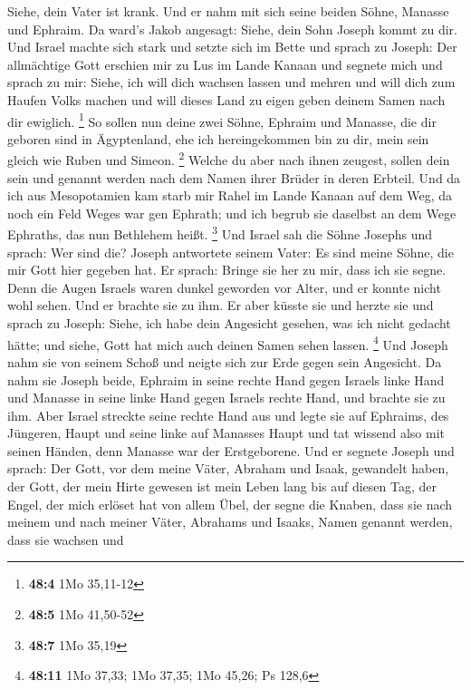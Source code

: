 Siehe, dein Vater ist krank. Und er nahm mit sich seine beiden Söhne,
Manasse und Ephraim.  Da ward's Jakob angesagt: Siehe, dein
Sohn Joseph kommt zu dir. Und Israel machte sich stark und setzte sich
im Bette  und sprach zu Joseph: Der allmächtige Gott
erschien mir zu Lus im Lande Kanaan und segnete mich  und
sprach zu mir: Siehe, ich will dich wachsen lassen und mehren und will
dich zum Haufen Volks machen und will dieses Land zu eigen geben deinem
Samen nach dir ewiglich. \footnote{\textbf{48:4} 1Mo 35,11-12}
 So sollen nun deine zwei Söhne, Ephraim und Manasse, die
dir geboren sind in Ägyptenland, ehe ich hereingekommen bin zu dir, mein
sein gleich wie Ruben und Simeon. \footnote{\textbf{48:5} 1Mo 41,50-52}
 Welche du aber nach ihnen zeugest, sollen dein sein und
genannt werden nach dem Namen ihrer Brüder in deren Erbteil.
 Und da ich aus Mesopotamien kam starb mir Rahel im Lande
Kanaan auf dem Weg, da noch ein Feld Weges war gen Ephrath; und ich
begrub sie daselbst an dem Wege Ephraths, das nun Bethlehem heißt.
\footnote{\textbf{48:7} 1Mo 35,19}  Und Israel sah die Söhne
Josephs und sprach: Wer sind die?  Joseph antwortete seinem
Vater: Es sind meine Söhne, die mir Gott hier gegeben hat. Er sprach:
Bringe sie her zu mir, dass ich sie segne.  Denn die Augen
Israels waren dunkel geworden vor Alter, und er konnte nicht wohl sehen.
Und er brachte sie zu ihm. Er aber küsste sie und herzte sie
 und sprach zu Joseph: Siehe, ich habe dein Angesicht
gesehen, was ich nicht gedacht hätte; und siehe, Gott hat mich auch
deinen Samen sehen lassen. \footnote{\textbf{48:11} 1Mo 37,33; 1Mo
  37,35; 1Mo 45,26; Ps 128,6}  Und Joseph nahm sie von
seinem Schoß und neigte sich zur Erde gegen sein Angesicht.
 Da nahm sie Joseph beide, Ephraim in seine rechte Hand
gegen Israels linke Hand und Manasse in seine linke Hand gegen Israels
rechte Hand, und brachte sie zu ihm.  Aber Israel streckte
seine rechte Hand aus und legte sie auf Ephraims, des Jüngeren, Haupt
und seine linke auf Manasses Haupt und tat wissend also mit seinen
Händen, denn Manasse war der Erstgeborene.  Und er segnete
Joseph und sprach: Der Gott, vor dem meine Väter, Abraham und Isaak,
gewandelt haben, der Gott, der mein Hirte gewesen ist mein Leben lang
bis auf diesen Tag,  der Engel, der mich erlöset hat von
allem Übel, der segne die Knaben, dass sie nach meinem und nach meiner
Väter, Abrahams und Isaaks, Namen genannt werden, dass sie wachsen und

